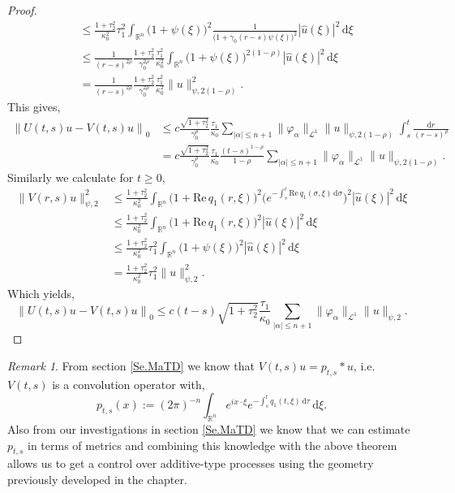 \documentclass[a4paper, 12pt]{report}
\theoremstyle{cor}
\theoremstyle{remark}
\newtheorem{remark}[theorem]{Remark}
\theoremstyle{definition}
\begin{document}
\begin{proof}
$$\begin{aligned}
& \le \frac{1 + \tau_2^2}{\kappa_0^2}\tau_1^2\int_{\mathbb{R}^n}\big(1 + \psi(\xi)\big)^2\frac{1}{\big(1 + \gamma_0(r - s)\psi(\xi)\big)^2}|\hat{u}(\xi)|^2\,\mathrm{d}\xi\\
& \le \frac{1}{(r - s)^{2\rho}}\frac{1 + \tau_2^2}{\gamma_0^{2\rho}}\frac{\tau_1^2}{\kappa_0^2}\int_{\mathbb{R}^n}\big(1 + \psi(\xi)\big)^{2(1 - \rho)}|\hat{u}(\xi)|^2\,\mathrm{d}\xi\\
& = \frac{1}{(r - s)^{2\rho}}\frac{1 + \tau_2^2}{\gamma_0^{2\rho}}\frac{\tau_1^2}{\kappa_0^2}\|u\|_{\psi, 2(1 - \rho)}^2.
\end{aligned}
$$
This gives,
$$
\begin{aligned}
\left\|U(t, s)u - V(t, s)u\right\|_0 & \le c\frac{\sqrt{1 + \tau_2^2}}{\gamma_0^\rho}\frac{\tau_1}{\kappa_0}\sum_{|\alpha| \le n + 1}\|\varphi_\alpha\|_{\mathcal{L}^1}\|u\|_{\psi, 2(1 - \rho)}\int_s^t\frac{\mathrm{d}r}{(r - s)^\rho}\\
& = c\frac{\sqrt{1 + \tau_2^2}}{\gamma_0^\rho}\frac{\tau_1}{\kappa_0}\frac{(t - s)^{1 - \rho}}{1 - \rho}\sum_{|\alpha| \le n + 1}\|\varphi_\alpha\|_{\mathcal{L}^1}\|u\|_{\psi, 2(1 - \rho)}.
\end{aligned}
$$
Similarly we calculate for $t \ge 0$,
$$
\begin{aligned}
\|V(r, s)u\|_{\psi, 2}^2 & \le \frac{1 + \tau_2^2}{\kappa_0^2}\int_{\mathbb{R}^n}\big(1 + \text{Re}\,q_1(r, \xi)\big)^2\Big(e^{-\int_s^r\text{Re}\,q_1(\sigma, \xi)\,\mathrm{d}\sigma}\Big)^2|\hat{u}(\xi)|^2\,\mathrm{d}\xi\\
& \le \frac{1 + \tau_2^2}{\kappa_0^2}\int_{\mathbb{R}^n}\big(1 + \text{Re}\,q_1(r, \xi)\big)^2|\hat{u}(\xi)|^2\,\mathrm{d}\xi\\
& \le \frac{1 + \tau_2^2}{\kappa_0^2}\tau_1^2\int_{\mathbb{R}^n}\big(1 + \psi(\xi)\big)^2|\hat{u}(\xi)|^2\,\mathrm{d}\xi\\
& = \frac{1 + \tau_2^2}{\kappa_0^2}\tau_1^2\|u\|_{\psi, 2}^2.
\end{aligned}
$$
Which yields,
$$
\left\|U(t, s)u - V(t, s)u\right\|_0 \le c(t - s)\sqrt{1 + \tau_2^2}\frac{\tau_1}{\kappa_0}\sum_{|\alpha| \le n + 1}\|\varphi_\alpha\|_{\mathcal{L}^1}\|u\|_{\psi, 2}.
$$
\end{proof}
\begin{remark}
From section \ref{Se.MaTD} we know that $V(t, s)u = p_{t, s} \ast u$, i.e. $V(t, s)$ is a convolution operator with,
$$
p_{t, s}(x) := (2\pi)^{-n}\int_{\mathbb{R}^n}e^{ix\cdot\xi}e^{-\int_s^tq_1(t, \xi)\,\mathrm{d}\tau}\,\mathrm{d}\xi.
$$
Also from our investigations in section \ref{Se.MaTD} we know that we can estimate $p_{t, s}$ in terms of metrics and combining this knowledge with the above theorem allows us to get a control over additive-type processes using the geometry previously developed in the chapter.
\end{remark}
\end{document}
